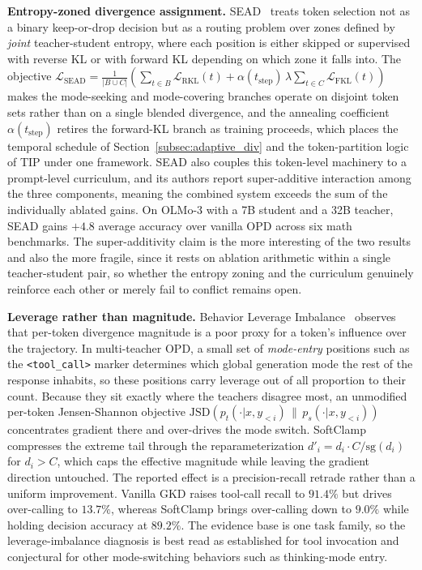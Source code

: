 \documentclass{article} %
\begin{document}
\textbf{Entropy-zoned divergence assignment.} SEAD~\citep{2606.28562} treats token selection not as a binary keep-or-drop decision but as a routing problem over zones defined by \emph{joint} teacher-student entropy, where each position is either skipped or supervised with reverse KL or with forward KL depending on which zone it falls into. The objective $\mathcal{L}_{\text{SEAD}} = \frac{1}{|B \cup C|}\left(\sum_{t \in B} \mathcal{L}_{\text{RKL}}(t) + \alpha(t_{\text{step}})\,\lambda \sum_{t \in C} \mathcal{L}_{\text{FKL}}(t)\right)$ makes the mode-seeking and mode-covering branches operate on disjoint token sets rather than on a single blended divergence, and the annealing coefficient $\alpha(t_{\text{step}})$ retires the forward-KL branch as training proceeds, which places the temporal schedule of Section~\ref{subsec:adaptive_div} and the token-partition logic of TIP under one framework. SEAD also couples this token-level machinery to a prompt-level curriculum, and its authors report super-additive interaction among the three components, meaning the combined system exceeds the sum of the individually ablated gains. On OLMo-3 with a 7B student and a 32B teacher, SEAD gains $+4.8$ average accuracy over vanilla OPD across six math benchmarks. The super-additivity claim is the more interesting of the two results and also the more fragile, since it rests on ablation arithmetic within a single teacher-student pair, so whether the entropy zoning and the curriculum genuinely reinforce each other or merely fail to conflict remains open.

\textbf{Leverage rather than magnitude.} Behavior Leverage Imbalance~\citep{2607.07050} observes that per-token divergence magnitude is a poor proxy for a token's influence over the trajectory. In multi-teacher OPD, a small set of \emph{mode-entry} positions such as the \texttt{<tool\_call>} marker determines which global generation mode the rest of the response inhabits, so these positions carry leverage out of all proportion to their count. Because they sit exactly where the teachers disagree most, an unmodified per-token Jensen-Shannon objective $\mathrm{JSD}(p_t(\cdot|x,y_{<i}) \,\|\, p_s(\cdot|x,y_{<i}))$ concentrates gradient there and over-drives the mode switch. SoftClamp compresses the extreme tail through the reparameterization $d'_i = d_i \cdot C / \mathrm{sg}(d_i)$ for $d_i > C$, which caps the effective magnitude while leaving the gradient direction untouched. The reported effect is a precision-recall retrade rather than a uniform improvement. Vanilla GKD raises tool-call recall to $91.4\%$ but drives over-calling to $13.7\%$, whereas SoftClamp brings over-calling down to $9.0\%$ while holding decision accuracy at $89.2\%$. The evidence base is one task family, so the leverage-imbalance diagnosis is best read as established for tool invocation and conjectural for other mode-switching behaviors such as thinking-mode entry.
\end{document}
